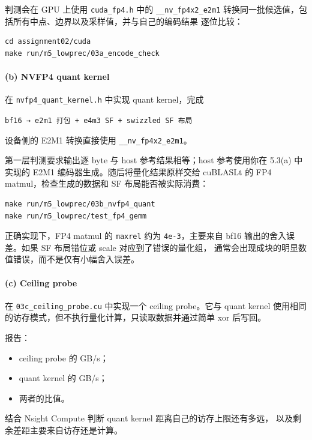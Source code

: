 \documentclass[11pt,a4paper,fontset=fandol]{ctexart}
\providecommand{\tightlist}{\setlength{\itemsep}{0pt}\setlength{\parskip}{0pt}}
\begin{document}
判测会在 GPU 上使用 \texttt{cuda\_fp4.h} 中的
\texttt{\_\_nv\_fp4x2\_e2m1}
转换同一批候选值，包括所有中点、边界以及采样值，并与自己的编码结果
逐位比较：

\begin{verbatim}
cd assignment02/cuda
make run/m5_lowprec/03a_encode_check
\end{verbatim}

\paragraph{(b) NVFP4 quant kernel}\label{b-nvfp4-quant-kernel}

在 \texttt{nvfp4\_quant\_kernel.h} 中实现 quant kernel，完成

\texttt{bf16\ →\ e2m1\ 打包\ +\ e4m3\ SF\ +\ swizzled\ SF\ 布局}

设备侧的 E2M1 转换直接使用 \texttt{\_\_nv\_fp4x2\_e2m1}。

第一层判测要求输出逐 byte 与 host 参考结果相等；host 参考使用你在 5.3(a)
中实现的 E2M1 编码器生成。随后将量化结果原样交给 cuBLASLt 的 FP4
matmul，检查生成的数据和 SF 布局能否被实际消费：

\begin{verbatim}
make run/m5_lowprec/03b_nvfp4_quant
make run/m5_lowprec/test_fp4_gemm
\end{verbatim}

正确实现下，FP4 matmul 的 \texttt{maxrel} 约为 \texttt{4e-3}，主要来自
bf16 输出的舍入误差。如果 SF 布局错位或 scale 对应到了错误的量化组，
通常会出现成块的明显数值错误，而不是仅有小幅舍入误差。

\paragraph{(c) Ceiling probe}\label{c-ceiling-probe}

在 \texttt{03c\_ceiling\_probe.cu} 中实现一个 ceiling probe。它与 quant
kernel 使用相同的访存模式，但不执行量化计算，只读取数据并通过简单 xor
后写回。

报告：

\begin{itemize}
\tightlist
\item
  ceiling probe 的 GB/s；
\item
  quant kernel 的 GB/s；
\item
  两者的比值。
\end{itemize}

结合 Nsight Compute 判断 quant kernel 距离自己的访存上限还有多远，
以及剩余差距主要来自访存还是计算。
\end{document}
